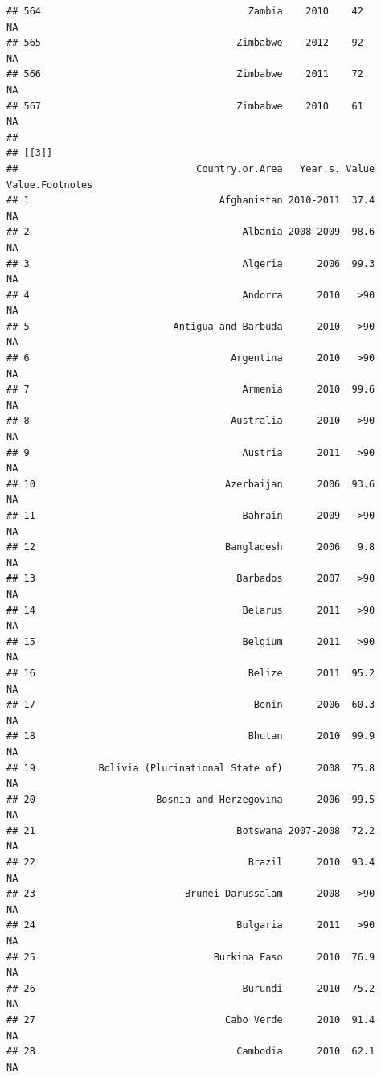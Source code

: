 \documentclass[
]{book}
\begin{document}
\begin{verbatim}
## 564                                    Zambia    2010    42              NA
## 565                                  Zimbabwe    2012    92              NA
## 566                                  Zimbabwe    2011    72              NA
## 567                                  Zimbabwe    2010    61              NA
## 
## [[3]]
##                               Country.or.Area   Year.s. Value Value.Footnotes
## 1                                 Afghanistan 2010-2011  37.4              NA
## 2                                     Albania 2008-2009  98.6              NA
## 3                                     Algeria      2006  99.3              NA
## 4                                     Andorra      2010   >90              NA
## 5                         Antigua and Barbuda      2010   >90              NA
## 6                                   Argentina      2010   >90              NA
## 7                                     Armenia      2010  99.6              NA
## 8                                   Australia      2010   >90              NA
## 9                                     Austria      2011   >90              NA
## 10                                 Azerbaijan      2006  93.6              NA
## 11                                    Bahrain      2009   >90              NA
## 12                                 Bangladesh      2006   9.8              NA
## 13                                   Barbados      2007   >90              NA
## 14                                    Belarus      2011   >90              NA
## 15                                    Belgium      2011   >90              NA
## 16                                     Belize      2011  95.2              NA
## 17                                      Benin      2006  60.3              NA
## 18                                     Bhutan      2010  99.9              NA
## 19           Bolivia (Plurinational State of)      2008  75.8              NA
## 20                     Bosnia and Herzegovina      2006  99.5              NA
## 21                                   Botswana 2007-2008  72.2              NA
## 22                                     Brazil      2010  93.4              NA
## 23                          Brunei Darussalam      2008   >90              NA
## 24                                   Bulgaria      2011   >90              NA
## 25                               Burkina Faso      2010  76.9              NA
## 26                                    Burundi      2010  75.2              NA
## 27                                 Cabo Verde      2010  91.4              NA
## 28                                   Cambodia      2010  62.1              NA

\end{verbatim}
\end{document}

